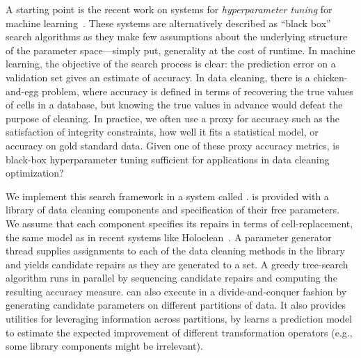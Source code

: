 





A starting point is the recent work on systems for \emph{hyperparameter tuning} for machine learning~\cite{li2017hyperband, sparks2017keystoneml, baylor2017tfx, golovin2017google, liaw2018tune}.
These systems are alternatively described as ``black box'' search algorithms as they make few assumptions about the underlying structure of the parameter space---simply put, generality at the cost of runtime.
In machine learning, the objective of the search process is clear: the prediction error on a validation set gives an estimate of accuracy. 
In data cleaning, there is a chicken-and-egg problem, where accuracy is defined in terms of recovering the true values of cells in a database, but knowing the true values in advance would defeat the purpose of cleaning.
In practice, we often use a proxy for accuracy such as the satisfaction of integrity constraints, how well it fits a statistical model, or accuracy on gold standard data.
Given one of these proxy accuracy metrics, is black-box hyperparameter tuning sufficient for applications in data cleaning optimization?

We implement this search framework in a system called \sys.
\sys is provided with a library of data cleaning components and specification of their free parameters. 
We assume that each component specifies its repairs in terms of cell-replacement, the same model as in recent systems like Holoclean~\cite{rekatsinas2017holoclean}.
A parameter generator thread supplies assignments to each of the data cleaning methods in the library and yields candidate repairs as they are generated to a set.
A greedy tree-search algorithm runs in parallel by sequencing candidate repairs and computing the resulting accuracy measure.
\sys can also execute in a divide-and-conquer fashion by generating candidate parameters on different partitions of data.
It also provides utilities for leveraging information across partitions, by learns a prediction model to estimate the expected improvement of different transformation operators (e.g., some library components might be irrelevant).  

